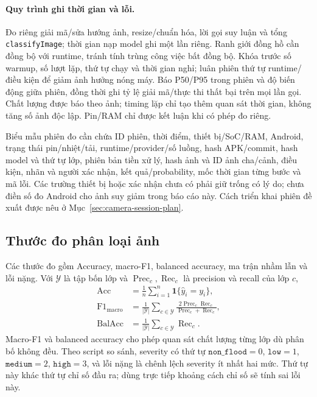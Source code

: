 \paragraph{Quy trình ghi thời gian và lỗi.} Đo riêng giải mã/sửa hướng ảnh, resize/chuẩn hóa, lời gọi suy luận và tổng \texttt{classifyImage}; thời gian nạp model ghi một lần riêng. Ranh giới đồng hồ cần đồng bộ với runtime, tránh tính trùng công việc bất đồng bộ. Khóa trước số warmup, số lượt lặp, thứ tự chạy và thời gian nghỉ; luân phiên thứ tự runtime/điều kiện để giảm ảnh hưởng nóng máy. Báo P50/P95 trong phiên và độ biến động giữa phiên, đồng thời ghi tỷ lệ giải mã/thực thi thất bại trên mọi lần gọi. Chất lượng được báo theo ảnh; timing lặp chỉ tạo thêm quan sát thời gian, không tăng số ảnh độc lập. Pin/RAM chỉ được kết luận khi có phép đo riêng.

Biểu mẫu phiên đo cần chứa ID phiên, thời điểm, thiết bị/SoC/RAM, Android, trạng thái pin/nhiệt/tải, runtime/provider/số luồng, hash APK/commit, hash model và thứ tự lớp, phiên bản tiền xử lý, hash ảnh và ID ảnh cha/cảnh, điều kiện, nhãn và người xác nhận, kết quả/probability, mốc thời gian từng bước và mã lỗi. Các trường thiết bị hoặc xác nhận chưa có phải giữ trống có lý do; chưa điền số đo Android cho ảnh suy giảm trong báo cáo này. Cách triển khai phiên đề xuất được nêu ở Mục~\ref{sec:camera-session-plan}.

\subsection{Thước đo phân loại ảnh}\label{sec:02-metrics-image}
Các thước đo gồm Accuracy, macro-F1, balanced accuracy, ma trận nhầm lẫn và lỗi nặng. Với $\mathcal Y$ là tập bốn lớp và $\operatorname{Prec}_c,\operatorname{Rec}_c$ là precision và recall của lớp $c$,
\begin{align}
 \operatorname{Acc}&=\frac{1}{n}\sum_{i=1}^{n}\mathbf{1}\{\widehat y_i=y_i\},\nonumber\\
 \operatorname{F1}_{\mathrm{macro}}&=\frac{1}{|\mathcal Y|}\sum_{c\in\mathcal Y}\frac{2\operatorname{Prec}_c\operatorname{Rec}_c}{\operatorname{Prec}_c+\operatorname{Rec}_c},\nonumber\\
 \operatorname{BalAcc}&=\frac{1}{|\mathcal Y|}\sum_{c\in\mathcal Y}\operatorname{Rec}_c.
 \label{eq:image-metrics}
\end{align}
Macro-F1 và balanced accuracy cho phép quan sát chất lượng từng lớp dù phân bố không đều. Theo script so sánh, severity có thứ tự $\texttt{non\_flood}=0$, $\texttt{low}=1$, $\texttt{medium}=2$, $\texttt{high}=3$, và lỗi nặng là chênh lệch severity ít nhất hai mức. Thứ tự này khác thứ tự chỉ số đầu ra; dùng trực tiếp khoảng cách chỉ số sẽ tính sai lỗi này.

